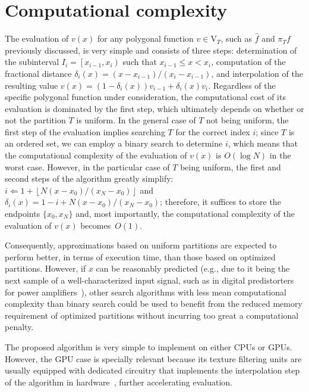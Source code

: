 \documentclass[a4paper,english]{IEEEtran}
\begin{document}
\section{Computational complexity}

\label{sec:Complexity}The evaluation of $v(x)$ for any polygonal
function $v\in{\mathrm{V}_{T}}$, such as ${\hat{f}}$ and ${\pi_{T}}{f}$ previously
discussed, is very simple and consists of three steps: determination
of the subinterval $I_{i}=\left[x_{i-1},x_{i}\right)$ such that $x_{i-1}\leq x<x_{i}$,
computation of the fractional distance $\delta_{i}(x)=(x-x_{i-1})/(x_{i}-x_{i-1})$,
and interpolation of the resulting value $v(x)=\left(1-\delta_{i}(x)\right)v_{i-1}+\delta_{i}(x)v_{i}$.
Regardless of the specific polygonal function under consideration,
the computational cost of its evaluation is dominated by the first
step, which ultimately depends on whether or not the partition ${T}$
is uniform. In the general case of ${T}$ not being uniform, the
first step of the evaluation implies searching ${T}$ for the correct
index $i$; since ${T}$ is an ordered set, we can employ a binary
search to determine $i$, which means that the computational complexity
of the evaluation of $v(x)$ is $O(\log N)$ in the worst case. However,
in the particular case of ${T}$ being uniform, the first and second
steps of the algorithm greatly simplify: $i\Leftarrow1+\left\lfloor N\left(x-x_{0}\right)/\left(x_{N}-x_{0}\right)\right\rfloor $
and $\delta_{i}(x)=1-i+N\left(x-x_{0}\right)/\left(x_{N}-x_{0}\right)$;
therefore, it suffices to store the endpoints $\{x_{0},x_{N}\}$ and,
most importantly, the computational complexity of the evaluation of
$v(x)$ becomes~$O(1)$. 

Consequently, approximations based on uniform partitions are expected
to perform better, in terms of execution time, than those based on
optimized partitions. However, if $x$ can be reasonably predicted
(e.g., due to it being the next sample of a well-characterized input
signal, such as in digital predistorters for power amplifiers~\cite{Cavers1999,Muhonen2000}),
other search algorithms with less mean computational complexity than
binary search could be used to benefit from the reduced memory requirement
of optimized partitions without incurring too great a computational
penalty.

The proposed algorithm is very simple to implement on either CPUs
or GPUs. However, the GPU case is specially relevant because its texture
filtering units are usually equipped with dedicated circuitry that
implements the interpolation step of the algorithm in hardware~\cite{doggett2012texture},
further accelerating evaluation. 
\end{document}
